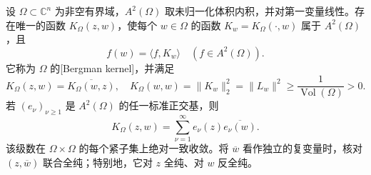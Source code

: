 \begin{theorem}\label{b3:thm:29-bergman-kernel}
设 \(\Omega\subset\mathbb C^n\) 为非空有界域，\(A^2(\Omega)\) 取未归一化体积内积，并对第一变量线性。存在唯一的函数 \(K_\Omega(z,w)\)，使每个 \(w\in\Omega\) 的函数 \(K_w=K_\Omega(\cdot,w)\) 属于 \(A^2(\Omega)\)，且
\begin{equation}\label{b3:eq:29-bergman-reproduction}
 f(w)=\langle f,K_w\rangle
 \quad(f\in A^2(\Omega)).
\end{equation}
它称为 \(\Omega\) 的[Bergman kernel]，并满足
\[
 K_\Omega(z,w)=\overline{K_\Omega(w,z)},
 \quad
 K_\Omega(w,w)=\|K_w\|_2^2=\|L_w\|^2
 \ge\frac1{\operatorname{Vol}(\Omega)}>0.
\]
若 \((e_\nu)_{\nu\ge1}\) 是 \(A^2(\Omega)\) 的任一标准正交基，则
\begin{equation}\label{b3:eq:29-bergman-basis-kernel}
 K_\Omega(z,w)=\sum_{\nu=1}^\infty
 e_\nu(z)\overline{e_\nu(w)}.
\end{equation}
该级数在 \(\Omega\times\Omega\) 的每个紧子集上绝对一致收敛。将 \(\overline w\) 看作独立的复变量时，核对 \((z,\overline w)\) 联合全纯；特别地，它对 \(z\) 全纯、对 \(w\) 反全纯。
\end{theorem}

